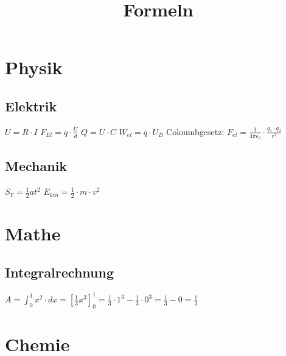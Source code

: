 \documentclass{article}
\title{Formeln}
\date{}
\author{}
\begin{document}
\maketitle

\section*{Physik}

\subsection*{Elektrik}

$U = R \cdot I$
\newline
$F_{El} = q \cdot \frac{U} {d}$
\newline
$Q = U \cdot C$
\newline
$W_{el} = q \cdot U_B$
\newline
Coloumbgesetz: $F_{el} = \frac{1}{4 \pi \epsilon_0} \cdot \frac{q_1 \cdot q_2}{r^2}$

\subsection* {Mechanik}

$S_Y = \frac{1} {2} at^2$
\newline
$E_{kin} = \frac{1} {2} \cdot m \cdot v^2$

\section*{Mathe}

\subsection*{Integralrechnung}

$A = \int_{0}^{1} x^2 \cdot dx = [\frac{1}{3} x^3]_0^1 = \frac{1}{3} \cdot 1^3 -\frac{1}{3} \cdot 0^3 = \frac{1}{3} - 0 = \frac{1}{3}$


\section*{Chemie}
\end{document}
